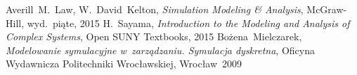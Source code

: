 \documentclass[12pt, a4paper, oneside]{mwart} %
\begin{document}
\begin{thebibliography}{9}
Averill~M.~Law, W.~David~Kelton,
\emph{Simulation Modeling \& Analysis},
McGraw-Hill, wyd.~piąte, 2015
H.~Sayama, \emph{Introduction to the Modeling and Analysis of Complex Systems},
Open SUNY Textbooks, 2015
Bożena~Mielczarek, \emph{Modelowanie symulacyjne w~zarządzaniu. Symulacja dyskretna},
Oficyna Wydawnicza Politechniki Wrocławskiej, Wrocław~2009
\end{thebibliography}
\end{document}
